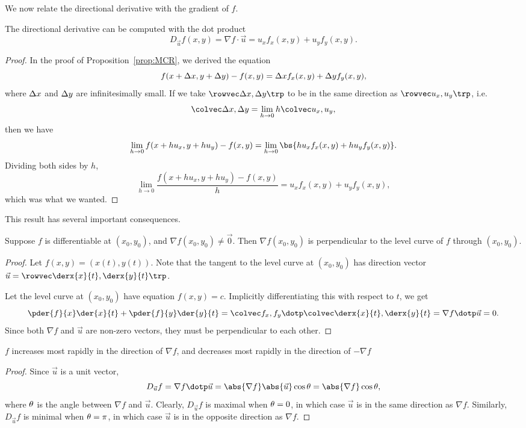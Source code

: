 We now relate the directional derivative with the gradient of $f$.

\begin{proposition}
    The directional derivative can be computed with the dot product \[D_{\vec u} f(x, y) = \nabla f \cdot \vec u = u_x f_x(x, y) + u_y f_y (x, y).\]
\end{proposition}
\begin{proof}
    In the proof of Proposition~\ref{prop:MCR}, we derived the equation \[f(x + \Delta x, y + \Delta y) - f(x, y) = \Delta x f_x(x, y) + \Delta y f_y(x, y),\] where $\Delta x$ and $\Delta y$ are infinitesimally small. If we take $\cveciix{\D x}{\D y}$ to be in the same direction as $\cveciix{u_x}{u_y}$, i.e. \[\cvecii{\D x}{\D y} = \lim_{h \to 0} h \cvecii{u_x}{u_y},\] then we have \[\lim_{h \to 0} f(x + h u_x, y + h u_y) - f(x, y) = \lim_{h \to 0} \bs{h u_x f_x(x, y) + h u_y f_y(x, y)}.\] Dividing both sides by $h$, \[\lim_{h \to 0} \frac{f(x + h u_x, y + h u_y) - f(x, y)}{h} = u_x f_x(x, y) + u_y f_y(x, y),\] which was what we wanted.
\end{proof}

This result has several important consequences.

\begin{proposition}
    Suppose $f$ is differentiable at $(x_0, y_0)$, and $\nabla f(x_0, y_0) \neq \vec 0$. Then $\nabla f(x_0, y_0)$ is perpendicular to the level curve of $f$ through $(x_0, y_0)$.
\end{proposition}
\begin{proof}
    Let $f(x, y) = (x(t), y(t))$. Note that the tangent to the level curve at $(x_0, y_0)$ has direction vector $\vec u = \cveciix{\derx{x}{t}}{\derx{y}{t}}$.
    
    Let the level curve at $(x_0, y_0)$ have equation $f(x, y) = c$. Implicitly differentiating this with respect to $t$, we get \[\pder{f}{x} \der{x}{t} + \pder{f}{y} \der{y}{t} = \cvecii{f_x}{f_y} \dotp \cvecii{\derx{x}{t}}{\derx{y}{t}} = \nabla f \dotp \vec u = 0.\] Since both $\nabla f$ and $\vec u$ are non-zero vectors, they must be perpendicular to each other.
\end{proof}

\begin{proposition}
    $f$ increases most rapidly in the direction of $\nabla f$, and decreases most rapidly in the direction of $-\nabla f$
\end{proposition}
\begin{proof}
    Since $\vec u$ is a unit vector, \[D_{\vec u} f = \nabla f \dotp \vec u = \abs{\nabla f} \abs{\vec u} \cos \t = \abs{\nabla f} \cos \t,\] where $\theta$ is the angle between $\nabla f$ and $\vec u$. Clearly, $D_{\vec u} f$ is maximal when $\theta = 0$, in which case $\vec u$ is in the same direction as $\nabla f$. Similarly, $D_{\vec u} f$ is minimal when $\theta = \pi$, in which case $\vec u$ is in the opposite direction as $\nabla f$.
\end{proof}

